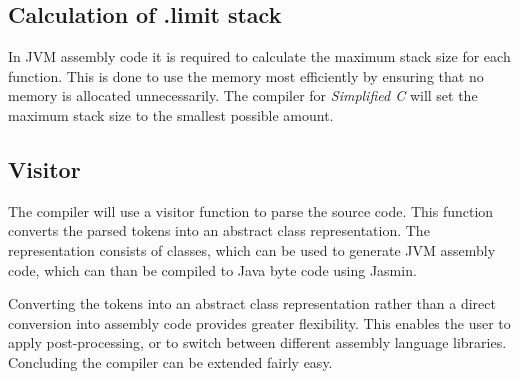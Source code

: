 \documentclass[12pt,a4paper,titlepage,oneside,final]{article}
\begin{document}


\subsection{Calculation of .limit stack}
In JVM assembly code it is required to calculate the maximum stack size for each function. This is done to use the memory most efficiently by ensuring that no memory is allocated unnecessarily. The compiler for \emph{Simplified C} will set the maximum stack size to the smallest possible amount.

\subsection{Visitor}
The compiler will use a visitor function to parse the source code. This function converts the parsed tokens into an abstract class representation. The representation consists of classes, which can be used to generate JVM assembly code, which can than be compiled to Java byte code using Jasmin. 

Converting the tokens into an abstract class representation rather than a direct conversion into assembly code provides greater flexibility. This enables the user to apply post-processing, or to switch between different assembly language libraries. Concluding the compiler can be extended fairly easy.

\pagebreak

\lstlistoflistings
\end{document}
